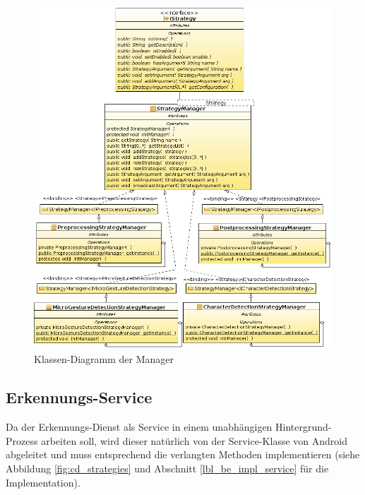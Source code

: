 \begin{figure}[bh!]
   \centering
   \includegraphics[width=\textwidth]{img/uml_cd_manager} 
   \caption{Klassen-Diagramm der Manager}
   \label{fig:cd_manager}
\end{figure}

\subsection{Erkennungs-Service}\label{lbl_be_design_service}

Da der Erkennungs-Dienst als Service in einem unabhängigen Hintergrund-Prozess arbeiten soll, wird dieser natürlich von der Service-Klasse von Android abgeleitet und muss entsprechend die verlangten Methoden implementieren  (siehe Abbildung \ref{fig:cd_strategies} und Abschnitt \ref{lbl_be_impl_service} für die Implementation).

